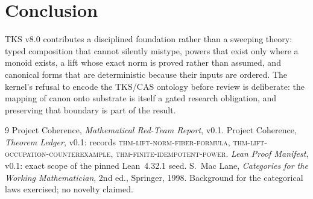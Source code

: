 \documentclass[11pt]{amsart}
\theoremstyle{definition}
\theoremstyle{remark}
\begin{document}
\section{Conclusion}

TKS v8.0 contributes a disciplined foundation rather than a sweeping theory: typed composition that cannot silently mistype, powers that exist only where a monoid exists, a lift whose exact norm is proved rather than assumed, and canonical forms that are deterministic because their inputs are ordered. The kernel's refusal to encode the TKS/CAS ontology before review is deliberate: the mapping of canon onto substrate is itself a gated research obligation, and preserving that boundary is part of the result.

\begin{thebibliography}{9}
 Project Coherence, \emph{Mathematical Red-Team Report}, v0.1.
 Project Coherence, \emph{Theorem Ledger}, v0.1: records \textsc{thm-lift-norm-fiber-formula}, \textsc{thm-lift-occupation-counterexample}, \textsc{thm-finite-idempotent-power}.
 \emph{Lean Proof Manifest}, v0.1: exact scope of the pinned Lean~4.32.1 seed.
 S.~Mac Lane, \emph{Categories for the Working Mathematician}, 2nd ed., Springer, 1998. Background for the categorical laws exercised; no novelty claimed.
\end{thebibliography}
\end{document}
